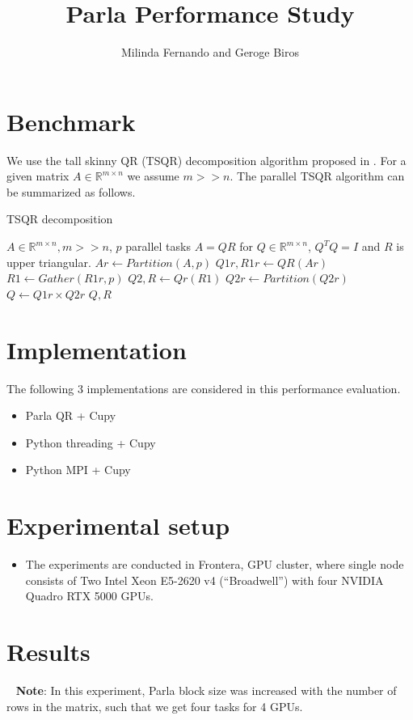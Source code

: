 \documentclass{article}
\title{Parla Performance Study}
\author{Milinda Fernando and Geroge Biros}
\newcommand{\R}{\mathbb{R}}
\begin{document}
\maketitle

\section{Benchmark} 
We use the tall skinny QR (TSQR) decomposition algorithm proposed in \cite{}. For a given matrix $A\in \R^{m\times n}$ we assume $m>>n$. The parallel TSQR algorithm can be summarized as follows. 

\begin{algorithm}
    \caption{TSQR decomposition}
    \begin{algorithmic} 
    \REQUIRE $A \in \R^{m\times n}, m>>n$, $p$ parallel tasks
    \ENSURE $A=QR$ for $Q\in \R^{m\times n }$, $Q^TQ=I$ and $R$ is upper triangular.
    \STATE $Ar \leftarrow Partition(A,p)$
    \STATE $Q1r,R1r \leftarrow QR(Ar)$
    \STATE $R1 \leftarrow Gather(R1r,p)$
    \STATE $Q2,R \leftarrow Qr(R1)$
    \STATE $Q2r \leftarrow Partition(Q2r)$ 
    \STATE $Q\leftarrow Q1r \times Q2r$
    \RETURN $Q,R$
    \end{algorithmic}
\end{algorithm}

\section{Implementation}
The following 3 implementations are considered in this performance evaluation. 
\begin{itemize}
    \item Parla QR + Cupy
    \item Python threading + Cupy
    \item Python MPI + Cupy
\end{itemize}

\section{Experimental setup}
\begin{itemize}
    \item The experiments are conducted in Frontera, GPU cluster, where single node consists of Two Intel Xeon E5-2620 v4 (“Broadwell”) with four NVIDIA Quadro RTX 5000 GPUs.
\end{itemize}

\section{Results}
\textbullet~ \textbf{Note}: In this experiment, Parla block size was increased with the number of rows in the matrix, such that we get four tasks for 4 GPUs. 
\end{document}
